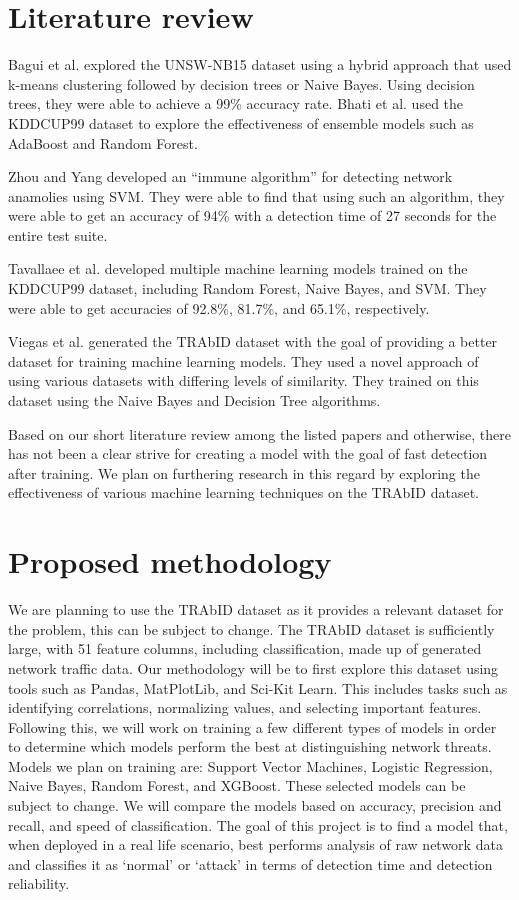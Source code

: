\section{Literature review}
Bagui et al. explored the UNSW-NB15 dataset using a hybrid approach that used k-means clustering followed by decision trees or Naive Bayes. Using decision trees, they were able to achieve a 99\% accuracy rate. \cite{bagui2019using} Bhati et al. used the KDDCUP99 dataset to explore the effectiveness of ensemble models such as AdaBoost and Random Forest. \cite{bhati2022ensemble} 

Zhou and Yang  developed an ``immune algorithm'' for detecting network anamolies using SVM. They were able to find that using such an algorithm, they were able to get an accuracy of 94\% with a detection time of 27 seconds for the entire test suite. \cite{zhou2006using}

Tavallaee et al. developed multiple machine learning models trained on the KDDCUP99 dataset, including Random Forest, Naive Bayes, and SVM. They were able to get accuracies of 92.8\%, 81.7\%, and 65.1\%, respectively. \cite{tavallaee2009detailed}

Viegas et al. generated the TRAbID dataset with the goal of providing a better dataset for training machine learning models. They used a novel approach of using various datasets with differing levels of similarity. They trained on this dataset using the Naive Bayes and Decision Tree algorithms. \cite{viegas2017toward}

Based on our short literature review among the listed papers and otherwise, there has not been a clear strive for creating a model with the goal of fast detection after training. We plan on furthering research in this regard by exploring the effectiveness of various machine learning techniques on the TRAbID dataset.

\section{Proposed methodology}
We are planning to use the TRAbID dataset \cite{viegas2017toward} as it provides a relevant dataset for the problem, this can be subject to change. The TRAbID dataset is sufficiently large, with 51 feature columns, including classification, made up of generated network traffic data. Our methodology will be to first explore this dataset using tools such as Pandas, MatPlotLib, and Sci-Kit Learn. This includes tasks such as identifying correlations, normalizing values, and selecting important features. Following this, we will work on training a few different types of models in order to determine which models perform the best at distinguishing network threats. Models we plan on training are: Support Vector Machines, Logistic Regression, Naive Bayes, Random Forest, and XGBoost. These selected models can be subject to change. We will compare the models based on accuracy, precision and recall, and speed of classification. The goal of this project is to find a model that, when deployed in a real life scenario, best performs analysis of raw network data and classifies it as `normal' or `attack' in terms of detection time and detection reliability.

